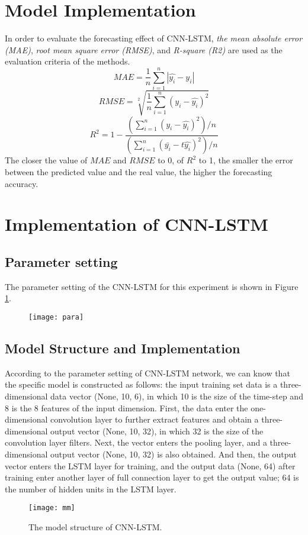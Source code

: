 \documentclass[12pt]{article}
\begin{document}
\section{Model Implementation}
In order to evaluate the forecasting effect of CNN-LSTM, \textit{the mean absolute error (MAE)}, \textit{root mean square error (RMSE)}, and \textit{R-square (R2)} are used as the evaluation criteria of the methods.
$$MAE= \frac{1}{n}\sum_{i=1}^{n}|\hat{y_i}-y_i|$$
$$RMSE= \sqrt[2]{\frac{1}{n}\sum_{i=1}^{n}{(y_i-\hat{y_i})}^2}$$
$$R^2=1-\frac{(\sum_{i=1}^n{(y_i-\hat{y_i})}^2)/n}{(\sum_{i=1}^n{(\bar{y_i}-t\hat{y_i})}^2)/n}$$
The closer the value of $MAE$ and $RMSE$ to 0, of $R^2$ to 1, the smaller the error between the predicted value and the real value, the higher the forecasting accuracy.
\section{Implementation of CNN-LSTM}
\subsection{Parameter setting}
The parameter setting of the CNN-LSTM for this experiment is shown in Figure \ref{fig:par}.
\begin{figure}[h]
\centering
\texttt{[image: para]}
\label{fig:par}
\end{figure}
\clearpage
\subsection{Model Structure and Implementation}
According to the parameter setting of CNN-LSTM network, we can know that the specific model is constructed as follows: the input training set data is a three-dimensional data vector (None, 10, 6), in which 10 is the size of the time-step and 8 is the 8 features of the input dimension. First, the data enter the one-dimensional convolution layer to further extract features and obtain a three-dimensional output vector (None, 10, 32), in which 32 is the size of the convolution layer filters. Next, the vector enters the pooling layer, and a three-dimensional output vector (None, 10, 32) is also obtained. And then, the output vector enters the LSTM layer for training, and the output data (None, 64) after training enter another layer of full connection layer to get the output value; 64 is the number of hidden units in the LSTM layer.
\begin{figure}[h]
\centering
\texttt{[image: mm]}
\caption{The model structure of CNN-LSTM.}

\end{figure}
\end{document}

